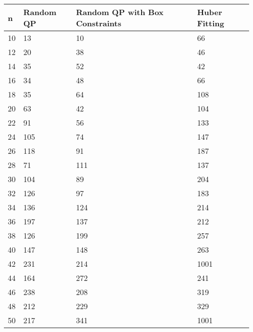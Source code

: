 \begin{tabular}{llll}
n & Random QP & Random QP with Box Constraints & Huber Fitting \\ 
\hline 
10 & 13 & 10 & 66 \\ 
12 & 20 & 38 & 46 \\ 
14 & 35 & 52 & 42 \\ 
16 & 34 & 48 & 66 \\ 
18 & 35 & 64 & 108 \\ 
20 & 63 & 42 & 104 \\ 
22 & 91 & 56 & 133 \\ 
24 & 105 & 74 & 147 \\ 
26 & 118 & 91 & 187 \\ 
28 & 71 & 111 & 137 \\ 
30 & 104 & 89 & 204 \\ 
32 & 126 & 97 & 183 \\ 
34 & 136 & 124 & 214 \\ 
36 & 197 & 137 & 212 \\ 
38 & 126 & 199 & 257 \\ 
40 & 147 & 148 & 263 \\ 
42 & 231 & 214 & 1001 \\ 
44 & 164 & 272 & 241 \\ 
46 & 238 & 208 & 319 \\ 
48 & 212 & 229 & 329 \\ 
50 & 217 & 341 & 1001 \\ 
\hline 
\end{tabular}